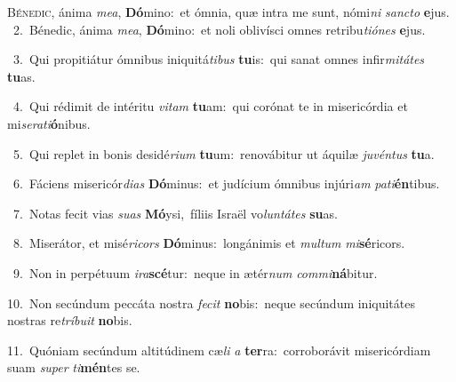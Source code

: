 \lettrine{\initial\textcolor{\initialcolor}{B}}{énedic,} ánima \textit{me}\-\textit{a}, \textbf{Dó}\-mino:~\star et ómnia, quæ intra me sunt, nómi\textit{ni} \textit{sanc}\-\textit{to} \textbf{e}\-jus.\\
{\numbfont\textcolor{\numbcolor}{~2.}}~Bénedic, ánima \textit{me}\-\textit{a}, \textbf{Dó}\-mino:~\star et noli oblivísci omnes retribu\-\textit{ti}\-\textit{ó}\textit{nes} \textbf{e}\-jus.\par
{\numbfont\textcolor{\numbcolor}{~3.}}~Qui propitiátur ómnibus iniquitá\-\textit{ti}\-\textit{bus} \textbf{tu}\-is:~\star qui sanat omnes infir\-\textit{mi}\-\textit{tá}\textit{tes} \textbf{tu}\-as.\par
{\numbfont\textcolor{\numbcolor}{~4.}}~Qui rédimit de intéritu \textit{vi}\-\textit{tam} \textbf{tu}\-am:~\star qui corónat te in misericórdia et mi\-\textit{se}\-\textit{ra}\textit{ti}\textbf{ó}nibus.\par
{\numbfont\textcolor{\numbcolor}{~5.}}~Qui replet in bonis desidé\-\textit{ri}\-\textit{um} \textbf{tu}\-um:~\star renovábitur ut áquilæ \textit{ju}\-\textit{vén}\textit{tus} \textbf{tu}\-a.\par
{\numbfont\textcolor{\numbcolor}{~6.}}~Fáciens misericór\-\textit{di}\-\textit{as} \textbf{Dó}\-minus:~\star et judícium ómnibus injúri\textit{am} \textit{pa}\-\textit{ti}\textbf{én}tibus.\par
{\numbfont\textcolor{\numbcolor}{~7.}}~Notas fecit vias \textit{su}\-\textit{as} \textbf{Mó}\-ysi,~\star fíliis Israël vo\-\textit{lun}\-\textit{tá}\textit{tes} \textbf{su}\-as.\par
{\numbfont\textcolor{\numbcolor}{~8.}}~Miserátor, et misé\-\textit{ri}\-\textit{cors} \textbf{Dó}\-minus:~\star longánimis et \textit{mul}\-\textit{tum} \textit{mi}\-\textbf{sé}ricors.\par
{\numbfont\textcolor{\numbcolor}{~9.}}~Non in perpétuum \textit{i}\-\textit{ra}\textbf{scé}tur:~\star neque in ætér\textit{num} \textit{com}\-\textit{mi}\textbf{ná}bitur.\par
{\numbfont\textcolor{\numbcolor}{10.}}~Non secúndum peccáta nostra \textit{fe}\-\textit{cit} \textbf{no}\-bis:~\star neque secúndum iniquitátes nostras re\-\textit{trí}\-\textit{bu}\textit{it} \textbf{no}\-bis.\par
{\numbfont\textcolor{\numbcolor}{11.}}~Quóniam secúndum altitúdinem cæ\textit{li} \textit{a} \textbf{ter}\-ra:~\star corroborávit misericórdiam suam \textit{su}\-\textit{per} \textit{ti}\-\textbf{mén}tes se.\par
